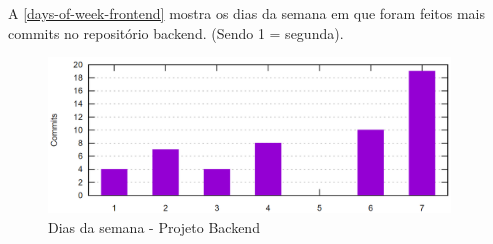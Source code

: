 A \autoref{days-of-week-frontend} mostra os dias da semana em que foram feitos mais commits no repositório backend. (Sendo 1 = segunda).
\begin{figure}[H]
	\centering
	\caption{\label{days-of-week-backend}Dias da semana - Projeto Backend}
	\includegraphics[width=0.95\textwidth]{../imagens/stats/days-of-week-backend.png}
\end{figure}
